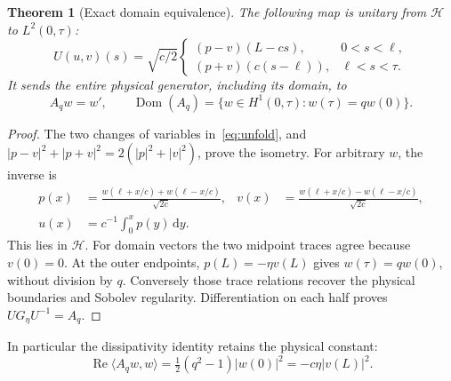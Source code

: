 \documentclass[10pt]{article}
\newcommand{\dd}{\,\mathrm d}
\DeclareMathOperator{\Ree}{Re}
\DeclareMathOperator{\dom}{Dom}
\newtheorem{theorem}{Theorem}
\begin{document}
\begin{theorem}[Exact domain equivalence]
The following map is unitary from $\mathcal H$ to $L^2(0,\tau)$:
\begin{equation}
 U(u,v)(s)=\sqrt{c/2}
 \begin{cases}
 (p-v)(L-cs),&0<s<\ell,\\
 (p+v)(c(s-\ell)),&\ell<s<\tau.
 \end{cases}
 \label{eq:unfold}
\end{equation}
It sends the entire physical generator, including its domain, to
\begin{equation}
 A_qw=w',\qquad \dom(A_q)=\{w\in H^1(0,\tau):w(\tau)=qw(0)\}.
 \label{eq:domain}
\end{equation}
\end{theorem}
\begin{proof}
The two changes of variables in~\eqref{eq:unfold}, and
$|p-v|^2+|p+v|^2=2(|p|^2+|v|^2)$, prove the isometry. For arbitrary $w$,
the inverse is
\begin{align}
 p(x)&=\frac{w(\ell+x/c)+w(\ell-x/c)}{\sqrt{2c}},&
 v(x)&=\frac{w(\ell+x/c)-w(\ell-x/c)}{\sqrt{2c}},\\
 u(x)&=c^{-1}\int_0^x p(y)\dd y.&&
\end{align}
This lies in $\mathcal H$. For domain vectors the two midpoint traces agree
because $v(0)=0$. At the outer endpoints, $p(L)=-\eta v(L)$ gives
$w(\tau)=qw(0)$, without division by $q$. Conversely those trace relations
recover the physical boundaries and Sobolev regularity. Differentiation on
each half proves $UG_\eta U^{-1}=A_q$.
\end{proof}
In particular the dissipativity identity retains the physical constant:
\begin{equation}
 \Ree\langle A_qw,w\rangle
 =\tfrac12(q^2-1)|w(0)|^2=-c\eta|v(L)|^2.
\end{equation}
\end{document}
